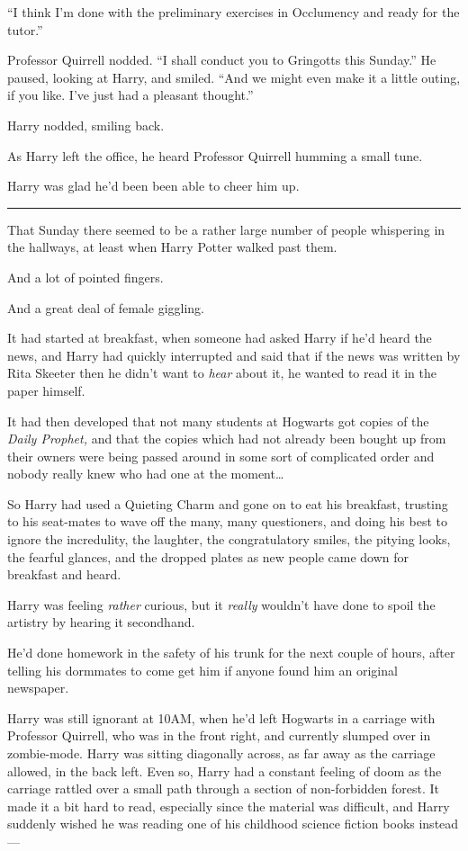 ``I think I'm done with the preliminary exercises in Occlumency and
ready for the tutor.''

Professor Quirrell nodded. ``I shall conduct you to Gringotts this
Sunday.'' He paused, looking at Harry, and smiled. ``And we might even
make it a little outing, if you like. I've just had a pleasant
thought.''

Harry nodded, smiling back.

As Harry left the office, he heard Professor Quirrell humming a small
tune.

Harry was glad he'd been been able to cheer him up.

\begin{center}\rule{3in}{0.4pt}\end{center}

That Sunday there seemed to be a rather large number of people
whispering in the hallways, at least when Harry Potter walked past them.

And a lot of pointed fingers.

And a great deal of female giggling.

It had started at breakfast, when someone had asked Harry if he'd heard
the news, and Harry had quickly interrupted and said that if the news
was written by Rita Skeeter then he didn't want to \emph{hear} about it,
he wanted to read it in the paper himself.

It had then developed that not many students at Hogwarts got copies of
the \emph{Daily Prophet,} and that the copies which had not already been
bought up from their owners were being passed around in some sort of
complicated order and nobody really knew who had one at the
moment\ldots{}

So Harry had used a Quieting Charm and gone on to eat his breakfast,
trusting to his seat-mates to wave off the many, many questioners, and
doing his best to ignore the incredulity, the laughter, the
congratulatory smiles, the pitying looks, the fearful glances, and the
dropped plates as new people came down for breakfast and heard.

Harry was feeling \emph{rather} curious, but it \emph{really} wouldn't
have done to spoil the artistry by hearing it secondhand.

He'd done homework in the safety of his trunk for the next couple of
hours, after telling his dormmates to come get him if anyone found him
an original newspaper.

Harry was still ignorant at 10AM, when he'd left Hogwarts in a carriage
with Professor Quirrell, who was in the front right, and currently
slumped over in zombie-mode. Harry was sitting diagonally across, as far
away as the carriage allowed, in the back left. Even so, Harry had a
constant feeling of doom as the carriage rattled over a small path
through a section of non-forbidden forest. It made it a bit hard to
read, especially since the material was difficult, and Harry suddenly
wished he was reading one of his childhood science fiction books
instead---

